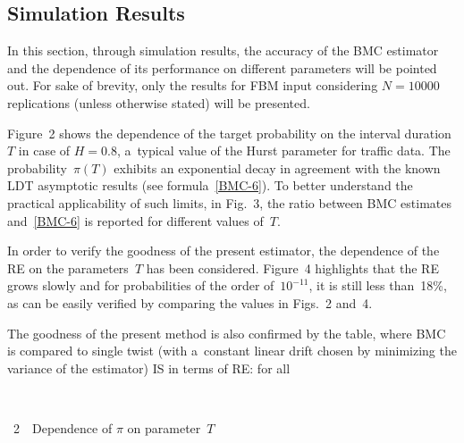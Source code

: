 \begin{multicols}{2}
\vspace*{-2pt}

\section{Simulation Results}

\vspace*{-2pt}

\noindent
In this section, through simulation results, the accuracy of the 
 BMC estimator and the dependence of its performance on different parameters
 will be pointed out. 
 For sake of brevity, only the results for FBM input  considering 
 $N=10000$ replications (unless otherwise stated) will be presented.

Figure~2 shows the dependence of the target probability on the interval 
duration~$T$ in case of $H=0.8$, a~typical value of the Hurst parameter for
 traffic data. The probability~$\pi(T)$ exhibits an exponential decay in 
 agreement with the known LDT asymptotic results (see formula~\eqref{BMC-6}). 
 To better understand the practical applicability of such limits, 
 in Fig.~3, the ratio between BMC estimates and~\eqref{BMC-6} is reported for 
 different values of~$T$.


In order to verify the goodness of the present estimator,  the 
dependence of the RE on the parameters~$T$ has been  considered. 
Figure~4 highlights 
that the RE grows slowly and for probabilities of the order of~$10^{-11}$, it is 
still less than~18\%, as can be easily verified by comparing the values in 
Figs.~2 and~4.



The goodness of the present method is also confirmed by the table, 
where BMC is compared to single twist (with a~constant linear drift 
chosen by minimizing  the variance of the estimator) IS in terms of RE: 
for all\linebreak\vspace*{-12pt}

{ \begin{center}  %
 \vspace*{12pt}
\mbox{%
\epsfxsize=77.933mm
}


\vspace*{1pt}


\noindent
{{\figurename~2}\ \ \small{Dependence of $\pi$ on parameter~$T$}}
\end{center}
}

\vspace*{1pt}



\end{multicols}
